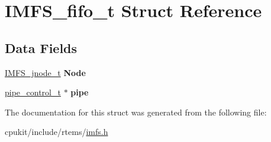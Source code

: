 \hypertarget{structIMFS__fifo__t}{}\section{I\+M\+F\+S\+\_\+fifo\+\_\+t Struct Reference}
\label{structIMFS__fifo__t}
\subsection*{Data Fields}
\begin{DoxyCompactItemize}
\item 
\mbox{\label{structIMFS__fifo__t_afd98be70e64291c03d368cd8822d3f9f}} 
\mbox{\hyperlink{structIMFS__jnode__tt}{I\+M\+F\+S\+\_\+jnode\+\_\+t}} {\bfseries Node}
\item 
\mbox{\label{structIMFS__fifo__t_a436c5c9aa142e17deece96ab7788eda4}} 
\mbox{\hyperlink{structpipe__control}{pipe\+\_\+control\+\_\+t}} $\ast$ {\bfseries pipe}
\end{DoxyCompactItemize}


The documentation for this struct was generated from the following file\+:\begin{DoxyCompactItemize}
\item 
cpukit/include/rtems/\mbox{\hyperlink{imfs_8h}{imfs.\+h}}\end{DoxyCompactItemize}
